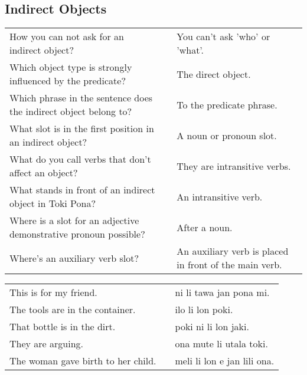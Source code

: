 \subsection*{Indirect Objects}
\label{'indirect_objects'}
%
\begin{supertabular}{p{5,5cm}|ll}
    How you can not ask for an indirect object?                      &  & You can't ask 'who' or 'what'.                         \\ %
    Which object type is strongly influenced by the predicate?       &  & The direct object.                                     \\ %
    Which phrase in the sentence does the indirect object belong to? &  & To the predicate phrase.                               \\ %
    What slot is in the first position in an indirect object?        &  & A noun or pronoun slot.                                \\ %
    What do you call verbs that don't affect an object?              &  & They are intransitive verbs.                           \\ %
    What stands in front of an indirect object in Toki Pona?         &  & An intransitive verb.                                  \\ %
    Where is a slot for an adjective demonstrative pronoun possible? &  & After a noun.                                          \\ %
    Where's an auxiliary verb slot?                                  &  & An auxiliary verb is placed in front of the main verb. \\ %
\end{supertabular}

\begin{supertabular}{p{5,5cm}|ll}
    This is for my friend.             &  & ni li tawa jan pona mi.     \\ %
    The tools are in the container.    &  & ilo li lon poki.            \\ %
    That bottle is in the dirt.        &  & poki ni li lon jaki.        \\ %
    They are arguing.                  &  & ona mute li utala toki.     \\ %
    The woman gave birth to her child. &  & meli li lon e jan lili ona. \\ %
\end{supertabular}

